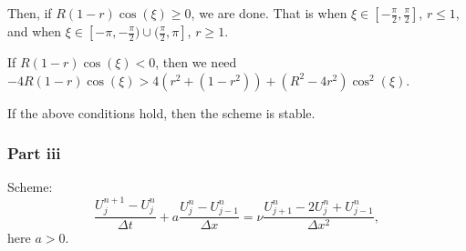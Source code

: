 \begin{answer}
    Then, if $R(1-r)\cos(\xi) \geq 0$, we are done. That is when $\xi \in [-\tfrac{\pi}{2},\tfrac{\pi}{2}]$, $r \leq 1$, and when $\xi \in [-\pi,-\tfrac{\pi}{2})\cup (\tfrac{\pi}{2},\pi]$, $r \geq 1$.
    
    If $R(1-r)\cos(\xi) <0$, then we need $-4R(1-r)\cos(\xi) > 4(r^2+(1-r^2)) + (R^2-4r^2)\cos^2(\xi)$.
    
    If the above conditions hold, then the scheme is stable.
\end{answer}

\subsubsection{Part iii}

\begin{question}
    Scheme: $$
    \frac{U_j^{n+1}-U_j^n}{\Delta t}+a \frac{U_j^n-U_{j-1}^n}{\Delta x}=\nu \frac{U_{j+1}^n-2 U_j^n+U_{j-1}^n}{\Delta x^2},
    $$
    here $a>0$.
\end{question}

